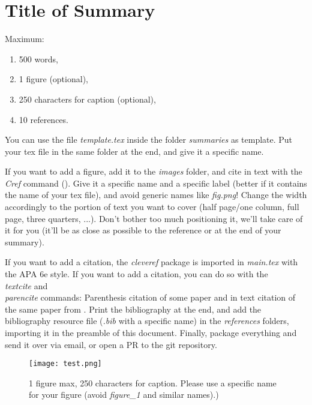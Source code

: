 \documentclass[../main.tex]{subfiles}
\begin{document}
\section{Title of Summary}



Maximum:
\begin{enumerate}
	\item 500 words,
	\item 1 figure (optional),
	\item 250 characters for caption (optional),
	\item 10 references.
\end{enumerate}

You can use the file \emph{template.tex} inside the folder \emph{summaries} as template. Put your tex file in the same folder at the end, and give it a specific name.

If you want to add a figure, add it to the \emph{images} folder, and cite in text with the \emph{\\Cref} command (). Give it a specific name and a specific label (better if it contains the name of your tex file), and avoid generic names like \emph{fig.png}! Change the width accordingly to the portion of text you want to cover (half page/one column, full page, three quarters, ...). Don't bother too much positioning it, we'll take care of it for you (it'll be as close as possible to the reference or at the end of your summary).

If you want to add a citation, the \emph{cleveref} package is imported in \emph{main.tex} with the APA 6e style. If you want to add a citation, you can do so with the \emph{\\textcite} and \emph{\\parencite} commands:
Parenthesis citation of some paper \parencite{Gau2021} and in text citation of the same paper from \parencite{Gau2021}.
Print the bibliography at the end, and add the bibliography resource file (\emph{.bib} with a specific name) in the \emph{references} folders, importing it in the preamble of this document.
Finally, package everything and send it over via email, or open a PR to the git repository.

\begin{figure}
	\centering
	\texttt{[image: test.png]}
	\caption{1 figure max, 250 characters for caption. Please use a specific name for your figure (avoid \emph{figure_1} and similar names).)}
	\label{fig:test}
\end{figure}
\end{document}
